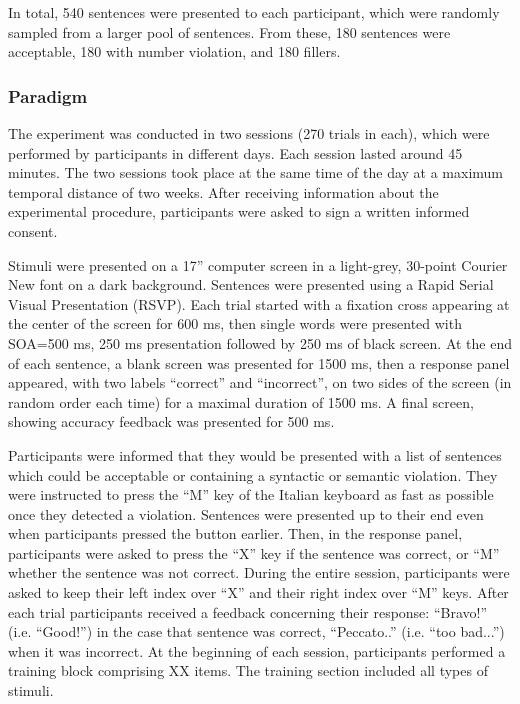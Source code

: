 In total, 540 sentences were presented to each participant, which were randomly sampled from a larger pool of sentences. From these, 180 sentences were acceptable, 180 with number violation, and 180 fillers. 

\subsubsection{Paradigm}
The experiment was conducted in two sessions (270 trials in each), which were performed by participants in different days. Each session lasted around 45 minutes. The two sessions took place at the same time of the day at a maximum temporal distance of two weeks. After receiving information about the experimental procedure, participants were asked to sign a written informed consent. 

Stimuli were presented on a 17” computer screen in a light-grey, 30-point Courier New font on a dark background. Sentences were presented using a Rapid Serial Visual Presentation (RSVP). Each trial started with a fixation cross appearing at the center of the screen for 600 ms, then single words were presented with SOA=500 ms, 250 ms presentation followed by 250 ms of black screen. At the end of each sentence, a blank screen was presented for 1500 ms, then a response panel appeared, with two labels “correct” and “incorrect”, on two sides of the screen (in random order each time) for a maximal duration of 1500 ms. A final screen, showing accuracy feedback was presented for 500 ms.

Participants were informed that they would be presented with a list of sentences which could be acceptable or containing a syntactic or semantic violation. They were instructed to press the “M” key of the Italian keyboard as fast as possible once they detected a violation. Sentences were presented up to their end even when participants pressed the button earlier. Then, in the response panel, participants were asked to press the “X” key if the sentence was correct, or “M” whether the sentence was not correct. During the entire session, participants were asked to keep their left index over “X” and their right index over “M” keys. After each trial participants received a feedback concerning their response: ``Bravo!'' (i.e. ``Good!'') in the case that sentence was correct, ``Peccato..'' (i.e. ``too bad...'') when it was incorrect. At the beginning of each session, participants performed a training block comprising XX items. The training section included all types of stimuli.

